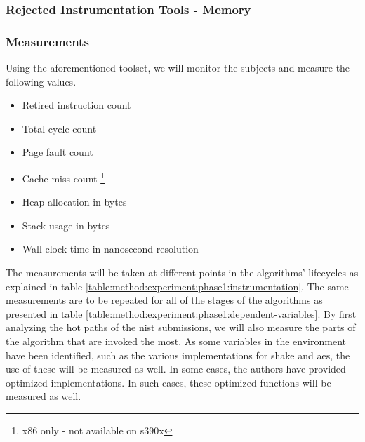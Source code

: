 \subsubsection{Rejected Instrumentation Tools - Memory}
\label{section:method:experiment:phase1:rejected-toolset-memory}

\subsubsection{Measurements}
\label{section:method:experiment:phase1:measurements}


Using the aforementioned toolset, we will monitor the subjects and measure the following values.

\begin{itemize}
    \item Retired instruction count
    \item Total cycle count
    \item Page fault count
    \item Cache miss count \footnote{x86 only - not available on s390x}
    \item Heap allocation in bytes
    \item Stack usage in bytes
    \item Wall clock time in nanosecond resolution
\end{itemize}

The measurements will be taken at different points in the algorithms' lifecycles as explained in table \ref{table:method:experiment:phase1:instrumentation}. The same measurements are to be repeated for all of the stages of the algorithms as presented in table \ref{table:method:experiment:phase1:dependent-variables}. By first analyzing the hot paths of the \gls{nist} submissions, we will also measure the parts of the algorithm that are invoked the most. As some variables in the environment have been identified, such as the various implementations for \gls{shake} and \gls{aes}, the use of these will be measured as well. In some cases, the authors have provided optimized implementations. In such cases, these optimized functions will be measured as well.

